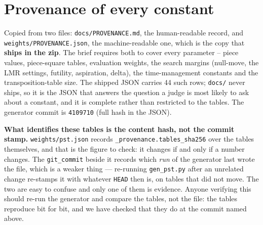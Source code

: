 \documentclass[11pt,a4paper]{article}
\newcommand{\code}[1]{\texttt{#1}}
\begin{document}
\appendix
\section{Provenance of every constant}\label{app:provenance}
Copied from two files: \code{docs/PROVENANCE.md}, the human-readable record, and
\code{weights/PROVENANCE.json}, the machine-readable one, which is the copy that \textbf{ships in
the zip}. The brief requires both to cover every parameter -- piece values, piece-square tables,
evaluation weights, the search margins (null-move, the LMR settings, futility, aspiration, delta),
the time-management constants and the transposition-table size. The shipped JSON carries 44 such
rows; \code{docs/} never ships, so it is the JSON that answers the question a judge is most likely
to ask about a constant, and it is complete rather than restricted to the tables. The generator
commit is \code{4109710} (full hash in the JSON).

\textbf{What identifies these tables is the content hash, not the commit stamp.}
\code{weights/pst.json} records \code{\_provenance.tables\_sha256} over the tables themselves, and
that is the figure to check: it changes if and only if a number changes. The
\code{git\_commit} beside it records which \emph{run} of the generator last wrote the file, which is
a weaker thing --- re-running \code{gen\_pst.py} after an unrelated change re-stamps it with
whatever \code{HEAD} then is, on tables that did not move. The two are easy to confuse and only one
of them is evidence. Anyone verifying this should re-run the generator and compare the tables, not
the file: the tables reproduce bit for bit, and we have checked that they do at the commit named
above.
\end{document}
